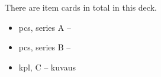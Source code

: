 There are  item cards in total in this deck. %

\small{
\begin{itemize}
	\item {} pcs, series A -- \descriptionA
	\item {} pcs, series B -- \descriptionB
	\item {} kpl, C -- kuvaus
\end{itemize}
}
\newpage